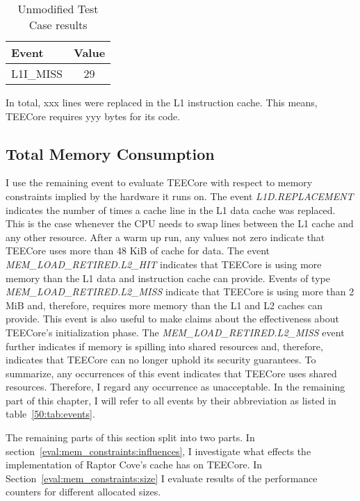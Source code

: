 \begin{table}[ht]
  \centering
  \begin{tabular}{ |l||c| }
    \hline
    Event            & Value \\
    \hline
    L1I\_MISS        & 29 \\
    \hline
  \end{tabular}
  \caption{Unmodified Test Case results}
  \label{50:tab:code_size}
\end{table}

In total, xxx lines were replaced in the L1 instruction
cache. This means, TEECore requires yyy bytes for its code.

\subsection{Total Memory Consumption}
I use the remaining event to evaluate TEECore with respect to memory constraints
implied by the hardware it runs on. The event \textit{L1D.REPLACEMENT} indicates
the number of times a cache line in the L1 data cache was replaced. This is the
case whenever the CPU needs to swap lines between the L1 cache and any other
resource. After a warm up run, any values not zero indicate that TEECore uses
more than 48 KiB of cache for data. The event
\textit{MEM\_LOAD\_RETIRED.L2\_HIT} indicates that TEECore is using more memory
than the L1 data and instruction cache can provide. Events of type
\textit{MEM\_LOAD\_RETIRED.L2\_MISS} indicate that TEECore is using more than 2
MiB and, therefore, requires more memory than the L1 and L2 caches can provide.
This event is also useful to make claims about the effectiveness about TEECore's
initialization phase. The \textit{MEM\_LOAD\_RETIRED.L2\_MISS} event further
indicates if memory is spilling into shared resources and, therefore, indicates
that TEECore can no longer uphold its security guarantees. To summarize, any
occurrences of this event indicates that TEECore uses shared resources.
Therefore, I regard any occurrence as unacceptable. In the remaining part of
this chapter, I will refer to all events by their abbreviation as listed in
table~\ref{50:tab:events}.

The remaining parts of this section split into two parts. In
section~\ref{eval:mem_constraints:influences}, I investigate what effects the
implementation of Raptor Cove's cache has on TEECore. In
Section~\ref{eval:mem_constraints:size} I evaluate results of the performance
counters for different allocated sizes.
\FloatBarrier

